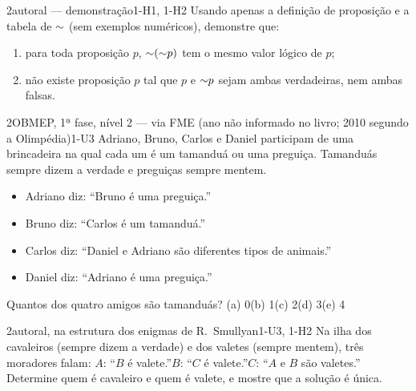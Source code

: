 \begin{questao}{2}{autoral — demonstração}{1-H1, 1-H2}\label{u1:q8}
Usando apenas a definição de proposição e a tabela de ${\sim}$ (sem exemplos numéricos), demonstre que:
\begin{enumerate}[label=\alph*)]
  \item para toda proposição $p$, ${\sim}({\sim} p)$ tem o mesmo valor lógico de $p$;
  \item não existe proposição $p$ tal que $p$ e ${\sim} p$ sejam ambas verdadeiras, nem ambas falsas.
\end{enumerate}
\end{questao}

\begin{questao}{2}{OBMEP, 1ª fase, nível 2 — via FME (ano não informado no livro; 2010 segundo a Olimpédia)}{1-U3}\label{u1:q9}
Adriano, Bruno, Carlos e Daniel participam de uma brincadeira na qual cada um é um tamanduá ou uma preguiça. Tamanduás sempre dizem a verdade e preguiças sempre mentem.
\begin{itemize}
  \item Adriano diz: \enquote{Bruno é uma preguiça.}
  \item Bruno diz: \enquote{Carlos é um tamanduá.}
  \item Carlos diz: \enquote{Daniel e Adriano são diferentes tipos de animais.}
  \item Daniel diz: \enquote{Adriano é uma preguiça.}
\end{itemize}
Quantos dos quatro amigos são tamanduás?\quad
(a) 0\quad (b) 1\quad (c) 2\quad (d) 3\quad (e) 4
\end{questao}

\begin{questao}{2}{autoral, na estrutura dos enigmas de R.~Smullyan}{1-U3, 1-H2}\label{u1:q10}
Na ilha dos cavaleiros (sempre dizem a verdade) e dos valetes (sempre mentem), três moradores falam:
$A$: \enquote{$B$ é valete.}\quad $B$: \enquote{$C$ é valete.}\quad $C$: \enquote{$A$ e $B$ são valetes.}
Determine quem é cavaleiro e quem é valete, e mostre que a solução é única.
\end{questao}

